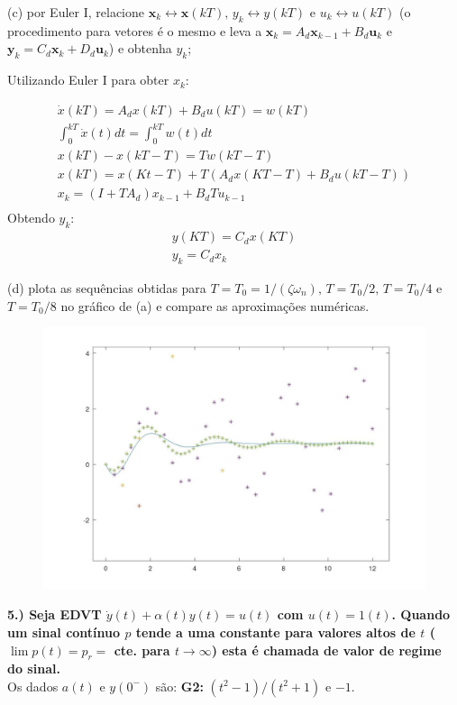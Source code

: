 \documentclass[10pt]{article}
\newcommand{\bm}[1]{\boldsymbol{#1}}
\begin{document}
(c) por Euler I, relacione $\bm{x}_k \leftrightarrow \bm{x}(kT), \, y_k \leftrightarrow y(kT)$ e $u_k \leftrightarrow u(kT)$ (o procedimento para vetores é o mesmo e leva a $\bm{x}_k = A_d \bm{x}_{k - 1} + B_d \bm{u}_k$ e $\bm{y}_k = C_d \bm{x}_k + D_d \bm{u}_k$) e obtenha $y_k$;

Utilizando Euler I para obter $x_k$:

\begin{align*}
    \dot{x}(kT) = A_dx(kT) + B_du(kT) = w(kT) \\
    \int_0^{kT}{\dot{x}(t)dt} = \int_0^{kT}{w(t)dt} \\
    x(kT) - x(kT - T) = Tw(kT - T) \\
    x(kT) = x(Kt - T) + T(A_dx(KT - T) + B_du(kT - T)) \\
    x_{k} = (I + TA_d)x_{k-1} + B_dTu_{k-1} \\
\end{align*}
Obtendo $y_k$:
\begin{align*}
    y(KT) = C_dx(KT) \\
    y_k = C_dx_k
\end{align*}

(d) plota as sequências obtidas para $T = T_0 = 1 / (\zeta \omega_n), \, T = T_0/2, \, T = T_0/4$ e $T = T_0/8$ no gráfico de (a) e compare as aproximações numéricas.

\begin{figure}[h]
    \includegraphics[scale=0.3]{questao4d}
    \centering
\end{figure}

\vspace{\baselineskip}

\textbf{5.) Seja EDVT $\dot{y}(t) + \alpha(t)y(t) = u(t)$ com $u(t) = 1(t)$. Quando um sinal contínuo $p$ tende a uma constante para valores altos de $t$ ($\lim p(t) = p_r = $ cte. para $t \to \infty$) esta é chamada de valor de regime do sinal.}\\
Os dados $a(t)$ e $y(0^-)$ são: \textbf{G2: }$(t^2 - 1)/(t^2 + 1)$ e $-1$.
\end{document}
